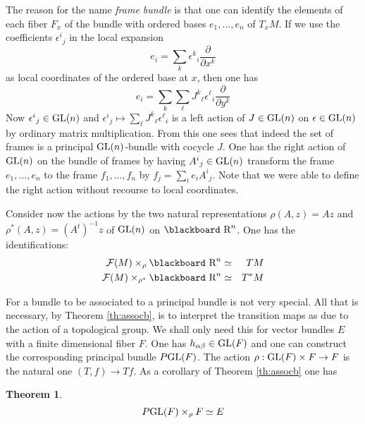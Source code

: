 \documentclass[12pt,titlepage]{article}
\def\bbf#1{\hbox{\blackboard #1}}
\def\lR{\bbf R}
\def\cF{{\cal F}}
\def\GL{\hbox{GL}}
\def\ppv#1#2{\frac{\partial}{\partial #1^#2}}
\newtheorem{theorem}{Theorem}
\begin{document}
The reason for the name {\em frame bundle\/}
%
 is that one can identify
the elements of each fiber \(F_x\) of the bundle with ordered bases
\(e_1,\dots,e_n\) of \(T_xM\).  If we use the coefficients
\(\epsilon^i{}_j\) in the local expansion 
\[
e_i = \sum_k
\epsilon^k{}_i\ppv{x}{k}
\]
 as local coordinates of the ordered base
 at \(x\), then one has 
\[e_i =
\sum_k\sum_\ell J^k{}_\ell\epsilon^\ell{}_i  \ppv{y}{k}
\] 
Now \(\epsilon^i{}_j \in \GL(n)\) and
\(\epsilon^i{}_j  \mapsto \sum_\ell J^k{}_\ell\epsilon^\ell{}_i  \) is a
left action of \(J\in \GL(n)\) on \linebreak
\(\epsilon \in \GL(n)\) by ordinary
matrix multiplication.  From this one sees that indeed the set of frames
is a principal \(\GL(n)\)-bundle with cocycle \(J\). One has the right
action of \(\GL(n)\) on the bundle of frames by having \(A^i{}_j\in \GL(n)
\) transform the frame \(e_1,\dots,e_n\) to the frame \(f_1,\dots,f_n\)
by \(f_j = \sum_i e_iA^i{}_j\).  Note that we were able to define the
right action without recourse to local coordinates.

Consider now the actions
by the two natural representations 
\(\rho(A,z) = Az \) and \(\rho^*(A,z) = (A^t)^{-1}z\)
of \(\GL(n)\) on \(\lR^n\).  
One has the identifications:
\begin{eqnarray*}
\cF(M)\times_\rho {\lR}^n  &\simeq &  TM \\
\cF(M)\times_{\rho^*} {\lR}^n &\simeq &  T^*M
\end{eqnarray*}%

For a bundle to be associated to a principal bundle is not very special.
All that is necessary, by Theorem \ref{th:assocb}, is to interpret the
transition maps as due to the action of a topological group. We shall
only need this for vector bundles \(E\)  with
a finite dimensional fiber \(F\).  One has \(h_{\alpha\beta}\in \GL(F)\)
and one can construct the corresponding principal bundle \(P\GL(F)\).
The action \(\rho:\GL(F)\times F\to F\) is the natural one
\((T,f)\to Tf\). As a corollary of Theorem \ref{th:assocb} one has
\begin{theorem}\label{th:eispgl}
\[
P\GL(F)\times_\rho F\simeq E
\] 
\end{theorem}
\end{document}
